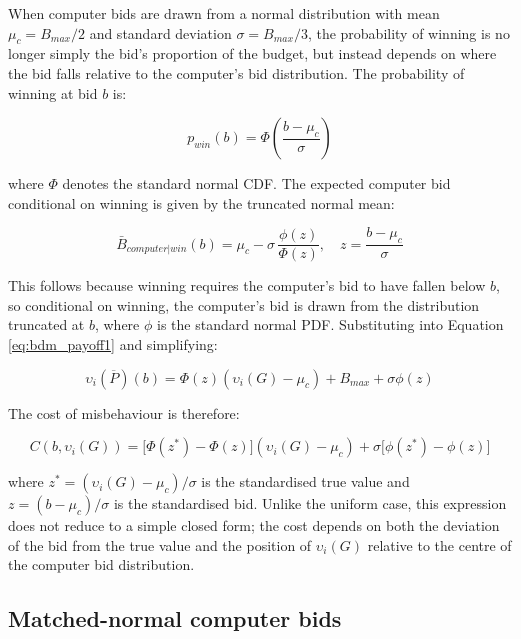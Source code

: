 When computer bids are drawn from a normal distribution with mean $\mu_c = B_{max}/2$ and standard deviation $\sigma = B_{max}/3$, the probability of winning is no longer simply the bid's proportion of the budget, but instead depends on where the bid falls relative to the computer's bid distribution. The probability of winning at bid $b$ is:

\begin{equation}
p_{win}(b) = \Phi\!\left(\frac{b - \mu_c}{\sigma}\right)
\label{eq:pwin_normal}
\end{equation}

where $\Phi$ denotes the standard normal CDF. The expected computer bid conditional on winning is given by the truncated normal mean:

\begin{equation}
\bar{B}_{computer|win}(b) = \mu_c - \sigma\,\frac{\phi(z)}{\Phi(z)}, \quad z = \frac{b - \mu_c}{\sigma}
\label{eq:ecb_normal}
\end{equation}

This follows because winning requires the computer's bid to have fallen below $b$, so conditional on winning, the computer's bid is drawn from the distribution truncated at $b$, where $\phi$ is the standard normal PDF. Substituting into Equation \ref{eq:bdm_payoff1} and simplifying:

\begin{equation}
\upsilon_i(\overline{P})(b) = \Phi(z)(\upsilon_i(G) - \mu_c) + B_{max} + \sigma\phi(z)
\label{eq:payoff_normal}
\end{equation}

The cost of misbehaviour is therefore:

\begin{equation}
C(b, \upsilon_i(G)) = \bigl[\Phi(z^*) - \Phi(z)\bigr](\upsilon_i(G) - \mu_c) + \sigma\bigl[\phi(z^*) - \phi(z)\bigr]
\label{eq:cost_normal}
\end{equation}

where $z^* = (\upsilon_i(G) - \mu_c)/\sigma$ is the standardised true value and $z = (b - \mu_c)/\sigma$ is the standardised bid. Unlike the uniform case, this expression does not reduce to a simple closed form; the cost depends on both the deviation of the bid from the true value and the position of $\upsilon_i(G)$ relative to the centre of the computer bid distribution.

\subsection*{Matched-normal computer bids}

